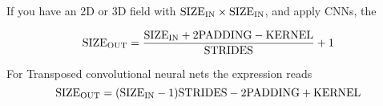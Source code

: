 \documentclass[12pt,a4paper]{paper}
\begin{document}

  




If you have an 2D or 3D field with ${\rm SIZE_{IN}}\times{\rm SIZE_{IN}}$, and apply CNNs, the 

\begin{equation}
{\rm SIZE_{OUT}} = \frac{{\rm SIZE_{IN}} + 2{\rm PADDING} - {\rm KERNEL}}{{\rm STRIDES}} + 1
\end{equation}

\vspace{1cm}

For Transposed convolutional neural nets the expression reads
\begin{equation}
{\rm SIZE_{OUT}} = ({\rm SIZE_{IN}-1}){\rm STRIDES} - 2{\rm PADDING} + {\rm KERNEL}
\end{equation}



%

 
\end{document}
